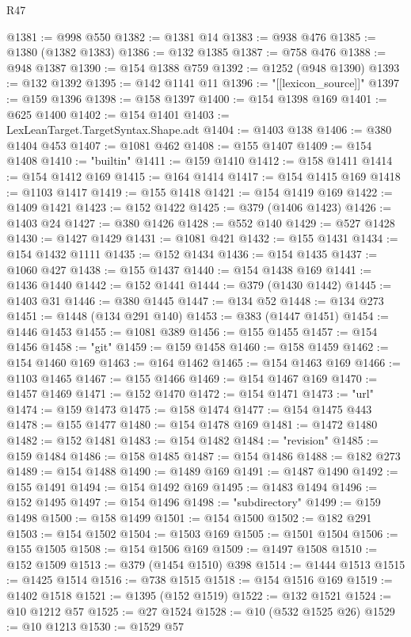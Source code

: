 \begin{lexlean}{R47}
\begin{coremodule}
@1381 := @998 @550
@1382 := @1381 @14
@1383 := @938 @476
@1385 := @1380 (@1382 @1383)
@1386 := @132 @1385
@1387 := @758 @476
@1388 := @948 @1387
@1390 := @154 @1388 @759
@1392 := @1252 (@948 @1390)
@1393 := @132 @1392
@1395 := @142 @1141 @11
@1396 := "[[lexicon_source]]"
@1397 := @159 @1396
@1398 := @158 @1397
@1400 := @154 @1398 @169
@1401 := @625 @1400
@1402 := @154 @1401
@1403 := LexLeanTarget.TargetSyntax.Shape.adt
@1404 := @1403 @138
@1406 := @380 @1404 @453
@1407 := @1081 @462
@1408 := @155 @1407
@1409 := @154 @1408
@1410 := "builtin"
@1411 := @159 @1410
@1412 := @158 @1411
@1414 := @154 @1412 @169
@1415 := @164 @1414
@1417 := @154 @1415 @169
@1418 := @1103 @1417
@1419 := @155 @1418
@1421 := @154 @1419 @169
@1422 := @1409 @1421
@1423 := @152 @1422
@1425 := @379 (@1406 @1423)
@1426 := @1403 @24
@1427 := @380 @1426
@1428 := @552 @140
@1429 := @527 @1428
@1430 := @1427 @1429
@1431 := @1081 @421
@1432 := @155 @1431
@1434 := @154 @1432 @1111
@1435 := @152 @1434
@1436 := @154 @1435
@1437 := @1060 @427
@1438 := @155 @1437
@1440 := @154 @1438 @169
@1441 := @1436 @1440
@1442 := @152 @1441
@1444 := @379 (@1430 @1442)
@1445 := @1403 @31
@1446 := @380 @1445
@1447 := @134 @52
@1448 := @134 @273
@1451 := @1448 (@134 @291 @140)
@1453 := @383 (@1447 @1451)
@1454 := @1446 @1453
@1455 := @1081 @389
@1456 := @155 @1455
@1457 := @154 @1456
@1458 := "git"
@1459 := @159 @1458
@1460 := @158 @1459
@1462 := @154 @1460 @169
@1463 := @164 @1462
@1465 := @154 @1463 @169
@1466 := @1103 @1465
@1467 := @155 @1466
@1469 := @154 @1467 @169
@1470 := @1457 @1469
@1471 := @152 @1470
@1472 := @154 @1471
@1473 := "url"
@1474 := @159 @1473
@1475 := @158 @1474
@1477 := @154 @1475 @443
@1478 := @155 @1477
@1480 := @154 @1478 @169
@1481 := @1472 @1480
@1482 := @152 @1481
@1483 := @154 @1482
@1484 := "revision"
@1485 := @159 @1484
@1486 := @158 @1485
@1487 := @154 @1486
@1488 := @182 @273
@1489 := @154 @1488
@1490 := @1489 @169
@1491 := @1487 @1490
@1492 := @155 @1491
@1494 := @154 @1492 @169
@1495 := @1483 @1494
@1496 := @152 @1495
@1497 := @154 @1496
@1498 := "subdirectory"
@1499 := @159 @1498
@1500 := @158 @1499
@1501 := @154 @1500
@1502 := @182 @291
@1503 := @154 @1502
@1504 := @1503 @169
@1505 := @1501 @1504
@1506 := @155 @1505
@1508 := @154 @1506 @169
@1509 := @1497 @1508
@1510 := @152 @1509
@1513 := @379 (@1454 @1510) @398
@1514 := @1444 @1513
@1515 := @1425 @1514
@1516 := @738 @1515
@1518 := @154 @1516 @169
@1519 := @1402 @1518
@1521 := @1395 (@152 @1519)
@1522 := @132 @1521
@1524 := @10 @1212 @57
@1525 := @27 @1524
@1528 := @10 (@532 @1525 @26)
@1529 := @10 @1213
@1530 := @1529 @57

\end{coremodule}
\end{lexlean}
